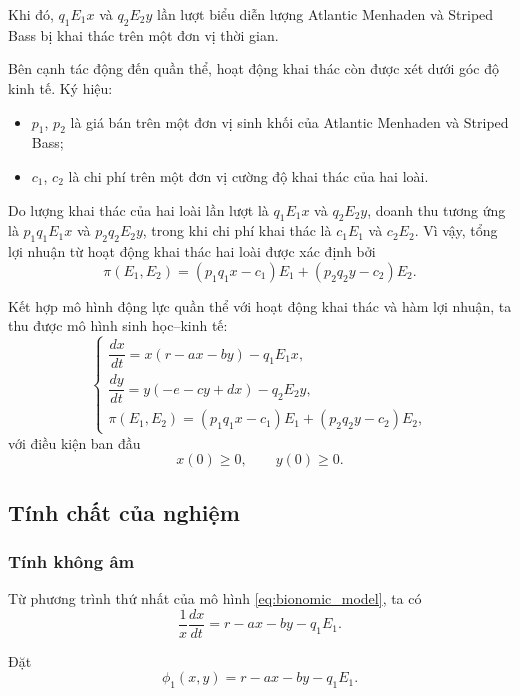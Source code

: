 Khi đó, $q_1E_1x$ và $q_2E_2y$ lần lượt biểu diễn lượng Atlantic Menhaden và Striped Bass bị khai thác trên một đơn vị thời gian.

\vspace{0.3cm}

Bên cạnh tác động đến quần thể, hoạt động khai thác còn được xét dưới góc độ kinh tế. Ký hiệu:
\begin{itemize}
    \item $p_1$, $p_2$ là giá bán trên một đơn vị sinh khối của Atlantic Menhaden và Striped Bass;
    \item $c_1$, $c_2$ là chi phí trên một đơn vị cường độ khai thác của hai loài.
\end{itemize}

Do lượng khai thác của hai loài lần lượt là $q_1E_1x$ và $q_2E_2y$, doanh thu tương ứng là $p_1q_1E_1x$ và $p_2q_2E_2y$, trong khi chi phí khai thác là $c_1E_1$ và $c_2E_2$. Vì vậy, tổng lợi nhuận từ hoạt động khai thác hai loài được xác định bởi
\[
\pi(E_1,E_2)
=
(p_1q_1x-c_1)E_1
+
(p_2q_2y-c_2)E_2.
\]

Kết hợp mô hình động lực quần thể với hoạt động khai thác và hàm lợi nhuận, ta thu được mô hình sinh học--kinh tế:
\begin{equation}
\begin{cases}
\dfrac{dx}{dt}
=
x(r-ax-by)-q_1E_1x, \\[8pt]

\dfrac{dy}{dt}
=
y(-e-cy+dx)-q_2E_2y, \\[8pt]

\pi(E_1,E_2)
=
(p_1q_1x-c_1)E_1
+
(p_2q_2y-c_2)E_2,
\end{cases}
\label{eq:bionomic_model}
\end{equation}
với điều kiện ban đầu
\[
x(0)\geq 0,
\qquad
y(0)\geq 0.
\]

\subsection{Tính chất của nghiệm}
\label{subsec:positivity_boundedness}

\subsubsection{Tính không âm}

Từ phương trình thứ nhất của mô hình \eqref{eq:bionomic_model}, ta có
\[
\frac{1}{x}\frac{dx}{dt}
=
r-ax-by-q_1E_1.
\]

Đặt
\[
\phi_1(x,y)
=
r-ax-by-q_1E_1.
\]

